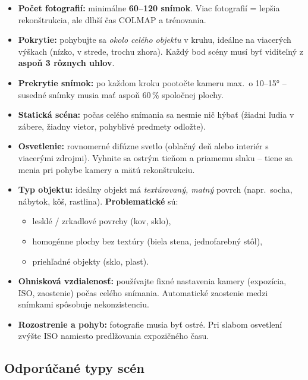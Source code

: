 \documentclass{article}
\begin{document}
\begin{itemize}
    \item \textbf{Počet fotografií:} minimálne \textbf{60–120 snímok}.
          Viac fotografií = lepšia rekonštrukcia, ale dlhší čas COLMAP a trénovania.
    \item \textbf{Pokrytie:} pohybujte sa \emph{okolo celého objektu} v kruhu,
          ideálne na viacerých výškach (nízko, v strede, trochu zhora).
          Každý bod scény musí byť viditeľný z \textbf{aspoň 3 rôznych uhlov}.
    \item \textbf{Prekrytie snímok:} po každom kroku pootočte kameru max.\
          o 10–15° – susedné snímky musia mať aspoň 60\,\% spoločnej plochy.
    \item \textbf{Statická scéna:} počas celého snímania sa nesmie nič hýbať
          (žiadni ľudia v zábere, žiadny vietor, pohyblivé predmety odložte).
    \item \textbf{Osvetlenie:} rovnomerné difúzne svetlo (oblačný deň alebo
          interiér s viacerými zdrojmi).
          Vyhnite sa ostrým tieňom a priamemu slnku – tiene sa menia
          pri pohybe kamery a mätú rekonštrukciu.
    \item \textbf{Typ objektu:} ideálny objekt má \emph{textúrovaný, matný}
          povrch (napr.\ socha, nábytok, kôš, rastlina).
          \textbf{Problematické} sú:
          \begin{itemize}
              \item lesklé / zrkadlové povrchy (kov, sklo),
              \item homogénne plochy bez textúry (biela stena, jednofarebný stôl),
              \item priehľadné objekty (sklo, plast).
          \end{itemize}
    \item \textbf{Ohnisková vzdialenosť:} používajte fixné nastavenia kamery
          (expozícia, ISO, zaostenie) počas celého snímania.
          Automatické zaostenie medzi snímkami spôsobuje nekonzistenciu.
    \item \textbf{Rozostrenie a pohyb:} fotografie musia byť ostré.
          Pri slabom osvetlení zvýšte ISO namiesto predlžovania expozičného času.
\end{itemize}

\subsection*{Odporúčané typy scén}
\end{document}
